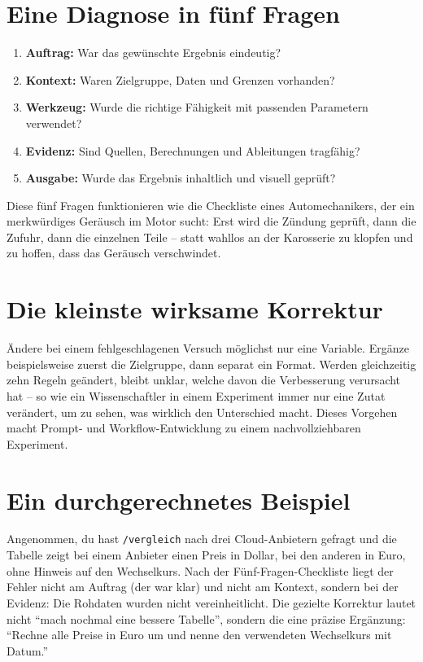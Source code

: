 \section{Eine Diagnose in fünf Fragen}

\begin{enumerate}
\item \textbf{Auftrag:} War das gewünschte Ergebnis eindeutig?
\item \textbf{Kontext:} Waren Zielgruppe, Daten und Grenzen vorhanden?
\item \textbf{Werkzeug:} Wurde die richtige Fähigkeit mit passenden Parametern verwendet?
\item \textbf{Evidenz:} Sind Quellen, Berechnungen und Ableitungen tragfähig?
\item \textbf{Ausgabe:} Wurde das Ergebnis inhaltlich und visuell geprüft?
\end{enumerate}

Diese fünf Fragen funktionieren wie die Checkliste eines Automechanikers, der ein merkwürdiges Geräusch im Motor sucht: Erst wird die Zündung geprüft, dann die Zufuhr, dann die einzelnen Teile -- statt wahllos an der Karosserie zu klopfen und zu hoffen, dass das Geräusch verschwindet.

\section{Die kleinste wirksame Korrektur}

Ändere bei einem fehlgeschlagenen Versuch möglichst nur eine Variable. Ergänze beispielsweise zuerst die Zielgruppe, dann separat ein Format. Werden gleichzeitig zehn Regeln geändert, bleibt unklar, welche davon die Verbesserung verursacht hat -- so wie ein Wissenschaftler in einem Experiment immer nur eine Zutat verändert, um zu sehen, was wirklich den Unterschied macht. Dieses Vorgehen macht Prompt- und Workflow-Entwicklung zu einem nachvollziehbaren Experiment.

\section{Ein durchgerechnetes Beispiel}

Angenommen, du hast \texttt{/vergleich} nach drei Cloud-Anbietern gefragt und die Tabelle zeigt bei einem Anbieter einen Preis in Dollar, bei den anderen in Euro, ohne Hinweis auf den Wechselkurs. Nach der Fünf-Fragen-Checkliste liegt der Fehler nicht am Auftrag (der war klar) und nicht am Kontext, sondern bei der Evidenz: Die Rohdaten wurden nicht vereinheitlicht. Die gezielte Korrektur lautet nicht ``mach nochmal eine bessere Tabelle'', sondern die eine präzise Ergänzung: ``Rechne alle Preise in Euro um und nenne den verwendeten Wechselkurs mit Datum.''

